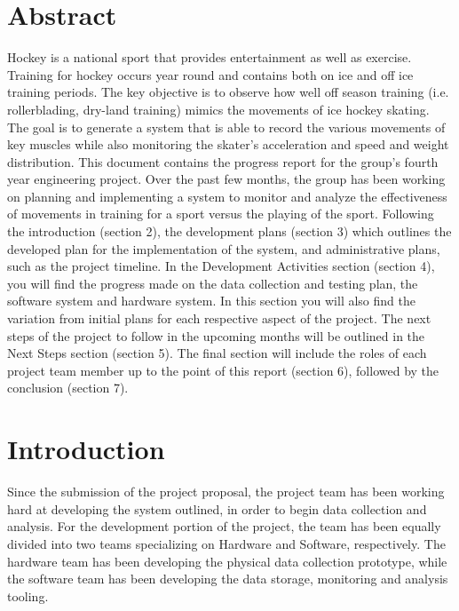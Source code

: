 \section{Abstract}
Hockey is a national sport that provides entertainment as well as exercise. Training for hockey occurs year round and contains both on ice and off ice training periods. The key objective is to observe how well off season training (i.e. rollerblading, dry-land training) mimics the movements of ice hockey skating. The goal is to generate a system that is able to record the various movements of key muscles while also monitoring the skater’s acceleration and speed and weight distribution. This document contains the progress report for the group's fourth year engineering project. Over the past few months, the group has been working on planning and implementing a system to monitor and analyze the effectiveness of movements in training for a sport versus the playing of the sport. Following the introduction (section 2), the development plans (section 3) which outlines the developed plan for the implementation of the system, and administrative plans, such as the project timeline. In the Development Activities section (section 4), you will find the progress made on the data collection and testing plan, the software system and hardware system. In this section you will also find the variation from initial plans for each respective aspect of the project. The next steps of the project to follow in the upcoming months will be outlined in the Next Steps section (section 5). The final section will include the roles of each project team member up to the point of this report (section 6), followed by the conclusion (section 7). 

\section{Introduction}
\setlength{\parindent}{5ex}
\indent
Since the submission of the project proposal, the project team has been working hard at developing the system outlined, in order to begin data collection and analysis. For the development portion of the project, the team has been equally divided into two teams specializing on Hardware and Software, respectively. The hardware team has been developing the physical data collection prototype, while the software team has been developing the data storage, monitoring and analysis tooling. 
